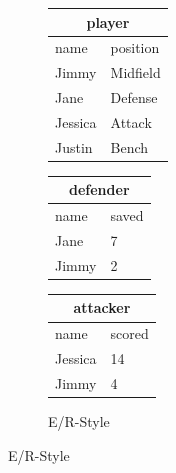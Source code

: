 \documentclass[a4paper]{article}
\begin{document}
\begin{itemize}
\begin{minipage}{0.7\linewidth}
\begin{figure}[H]
\begin{subfigure}{\linewidth}
\centering
\begin{tabular}{ll}
\multicolumn{2}{c}{player}\\\toprule
name&position\\\midrule
Jimmy&Midfield\\
Jane&Defense\\
Jessica&Attack\\
Justin&Bench\\\bottomrule
\end{tabular}
\hfill
\begin{tabular}{ll}
\multicolumn{2}{c}{defender}\\\toprule
name&saved\\\midrule
Jane&7\\
Jimmy&2\\\bottomrule
\end{tabular}
\hfill
\begin{tabular}{ll}
\multicolumn{2}{c}{attacker}\\\toprule
name&scored\\\midrule
Jessica&14\\
Jimmy&4\\\bottomrule
\end{tabular}
\caption*{E/R-Style}
\end{subfigure}
\end{figure}
\end{minipage}
\end{itemize}
\end{document}
